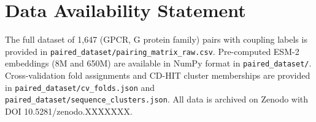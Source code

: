 \documentclass[11pt,a4paper]{article}
\begin{document}
\section{Data Availability Statement}

The full dataset of 1,647 (GPCR, G protein family) pairs with coupling labels is provided in \texttt{paired\_dataset/pairing\_matrix\_raw.csv}. Pre-computed ESM-2 embeddings (8M and 650M) are available in NumPy format in \texttt{paired\_dataset/}. Cross-validation fold assignments and CD-HIT cluster memberships are provided in \texttt{paired\_dataset/cv\_folds.json} and \texttt{paired\_dataset/sequence\_clusters.json}. All data is archived on Zenodo with DOI 10.5281/zenodo.XXXXXXX.
\end{document}
